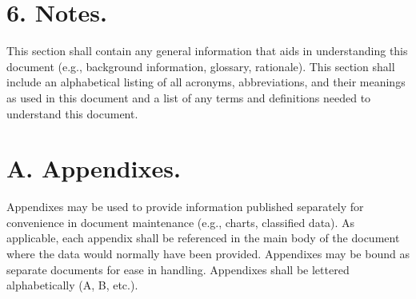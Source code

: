 \section{6. Notes.}

This section shall contain any general information that aids in
understanding this document (e.g., background information, glossary,
rationale). This section shall include an alphabetical listing of all
acronyms, abbreviations, and their meanings as used in this document and
a list of any terms and definitions needed to understand this document.

\section{A. Appendixes.}

Appendixes may be used to provide information published separately for
convenience in document maintenance (e.g., charts, classified data). As
applicable, each appendix shall be referenced in the main body of the
document where the data would normally have been provided. Appendixes
may be bound as separate documents for ease in handling. Appendixes
shall be lettered alphabetically (A, B, etc.).
